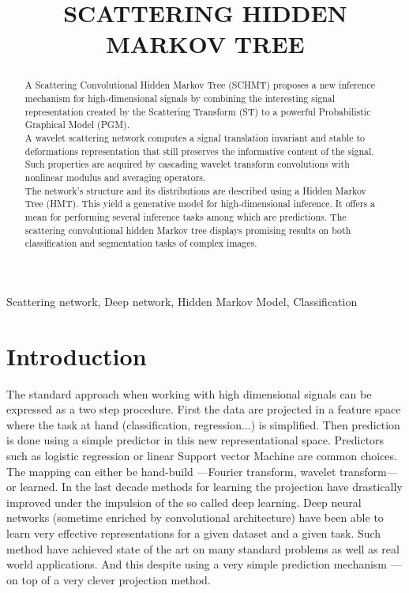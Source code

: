 \documentclass{article}
\title{SCATTERING HIDDEN MARKOV TREE}
\begin{document}
%
\maketitle
%
\begin{abstract}
	A Scattering Convolutional Hidden Markov Tree (SCHMT) proposes a new inference mechanism for high-dimensional signals by combining the interesting signal representation created by the Scattering Transform (ST) to a powerful Probabilistic Graphical Model (PGM). \\
	A wavelet scattering network computes a signal translation invariant and  stable to deformations representation that still preserves the informative content of the signal. Such properties are acquired by cascading wavelet transform convolutions with nonlinear modulus and averaging operators.\\
	The network's structure and its distributions are described using a Hidden Markov Tree (HMT). This yield a generative model for high-dimensional inference. It offers a mean for performing several inference tasks among which are predictions. The scattering convolutional hidden Markov tree displays promising results on both classification and segmentation tasks of complex images.
\end{abstract}
%
\begin{keywords}
	Scattering network, Deep network, Hidden Markov Model, Classification
\end{keywords}
%
\section{Introduction}
\label{sec:Intro}

	The standard approach when working with high dimensional signals can be expressed as a two step procedure. First the data are projected in a feature space where the task at hand (classification, regression...) is simplified. Then prediction is done using a simple predictor in this new representational space. Predictors such as logistic regression or linear Support vector Machine are common choices. The mapping can either be hand-build ---\eg Fourier transform, wavelet transform--- or learned. In the last decade methods for learning the projection have drastically improved under the impulsion of the so called deep learning. Deep neural networks (sometime enriched by convolutional architecture) have been able to learn very effective representations for a given dataset and a given task. Such method have achieved state of the art on many standard problems as well as real world applications. And this despite using a very simple prediction mechanism ---on top of a very clever projection method.
		
\end{document}
